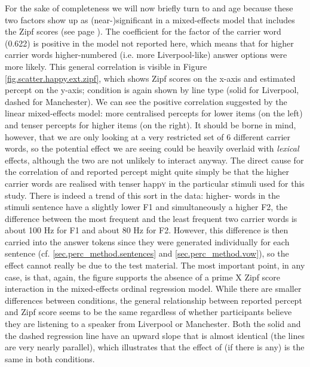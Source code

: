 For the sake of completeness we will now briefly turn to  and age because these two factors show up as (near-)significant in a mixed-effects model that includes the Zipf scores (see page \pageref{sec.perc_res.happy}).
The coefficient for the factor  of the carrier word (0.622) is positive in the model not reported here, which means that for higher  carrier words higher-numbered (i.e. more Liverpool-like) answer options were more likely.
This general correlation is visible in Figure \ref{fig.scatter.happy.ext.zipf}, which shows Zipf scores on the x-axis and estimated percept on the y-axis;  condition is again shown by line type (solid for Liverpool, dashed for Manchester).
We can see the positive correlation suggested by the linear mixed-effects model: more centralised percepts for lower  items (on the left) and tenser percepts for higher  items (on the right).
It should be borne in mind, however, that we are only looking at a very restricted set of 6 different carrier words, so the potential  effect we are seeing could be heavily overlaid with \emph{lexical} effects, although the two are not unlikely to interact anyway.
The direct cause for the correlation of  and reported percept might quite simply be that the higher  carrier words are realised with tenser happ\textsc{y} in the particular stimuli used for this study.
There is indeed a trend of this sort in the data: higher- words in the stimuli sentence have a slightly lower F1 and simultaneously a higher F2, the difference between the most frequent and the least frequent two carrier words is about 100 Hz for F1 and about 80 Hz for F2.
However, this difference is then carried into the answer tokens since they were generated individually for each sentence (cf. \ref{sec.perc_method.sentences} and \ref{sec.perc_method.vow}), so the effect cannot really be due to the test material.
The most important point, in any case, is that, again, the figure supports the absence of a prime X Zipf score interaction in the mixed-effects ordinal regression model.
While there are smaller differences between  conditions, the general relationship between reported percept and Zipf score seems to be the same regardless of whether participants believe they are listening to a speaker from Liverpool or Manchester.
Both the solid and the dashed regression line have an upward slope that is almost identical (the lines are very nearly parallel), which illustrates that the effect of  (if there is any) is the same in both  conditions.

